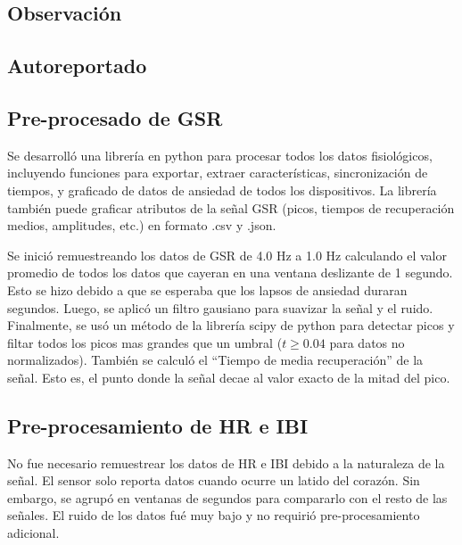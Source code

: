 	\subsection{Observaci\'on}
	\subsection{Autoreportado}
\subsection{Pre-procesado de GSR}\label{secc:gsrpreprocessing}
Se desarroll\'o una librer\'ia en python para procesar todos los datos fisiol\'ogicos, incluyendo funciones para exportar, extraer caracter\'isticas, sincronizaci\'on de tiempos, y graficado de datos de ansiedad de todos los dispositivos. La librer\'ia tambi\'en puede graficar atributos de la se\~nal GSR (picos, tiempos de recuperaci\'on medios, amplitudes, etc.) en formato .csv y .json.

Se inici\'o remuestreando los datos de GSR de 4.0 Hz a 1.0 Hz calculando el valor promedio de todos los datos que cayeran en una ventana deslizante de 1 segundo. Esto se hizo debido a que se esperaba que los lapsos de ansiedad duraran segundos. Luego, se aplic\'o un filtro gausiano para suavizar la se\~nal y el ruido. Finalmente, se us\'o un m\'etodo de la librer\'ia scipy de python para detectar picos y filtar todos los picos mas grandes que un umbral ($t \geqslant 0.04$ para datos no normalizados). Tambi\'en se calcul\'o el ``Tiempo de media recuperaci\'on'' de la se\~nal. Esto es, el punto donde la se\~nal decae al valor exacto de la mitad del pico.

\subsection{Pre-procesamiento de HR e IBI}\label{secc:hribipreprocessing}
No fue necesario remuestrear los datos de HR e IBI debido a la naturaleza de la se\~nal. El sensor solo reporta datos cuando ocurre un latido del coraz\'on. Sin embargo, se agrup\'o en ventanas de segundos para compararlo con el resto de las se\~nales. El ruido de los datos fu\'e muy bajo y no requiri\'o pre-procesamiento adicional.

\newpage


